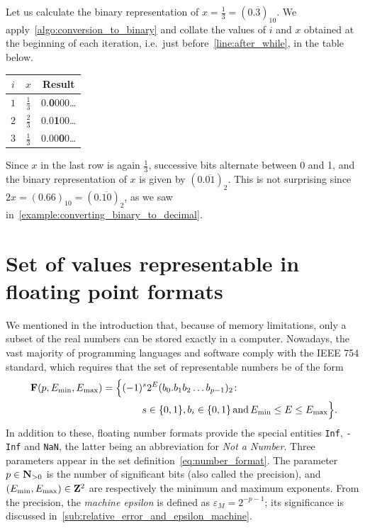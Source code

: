 \begin{example}
    Let us calculate the binary representation of $x = \frac{1}{3} = (0.\overline{3})_{10}$.
    We apply~\cref{algo:conversion_to_binary} and collate the values of $i$ and $x$ obtained at the beginning of each iteration,
    i.e.\ just before~\cref{line:after_while}, in the table below.
    \begin{center}
    \begin{tabular}{|c|c|c|}
        \hline
        $i$ & $x$ & Result \\ \hline
        $1$ & $\frac{1}{3}$ & 0.\textbf{0}000\dots \\ \hline
        $2$ & $\frac{2}{3}$ & 0.0\textbf{1}00\dots \\ \hline
        $3$ & $\frac{1}{3}$ & 0.00\textbf{0}0\dots \\ \hline
    \end{tabular}
    \end{center}
    Since $x$ in the last row is again $\frac{1}{3}$,
    successive bits alternate between 0 and 1,
    and the binary representation of $x$ is given by $(0.\overline{01})_2$.
    This is not surprising since $2x = (0.66)_{10} = (0.\overline{10})_2$,
    as we saw in~\cref{example:converting_binary_to_decimal}.
\end{example}



\section{Set of values representable in floating point formats}%
\label{sec:set_of_values}
We mentioned in the introduction that,
because of memory limitations,
only a subset of the real numbers can be stored exactly in a computer.
Nowadays, the vast majority of programming languages and software comply with the IEEE 754 standard,
which requires that the set of representable numbers be of the form
\begin{align}
    \notag
    \floating (p, E_{\min}, E_{\max})
    = \Bigl\{ & (-1)^s 2^E (b_0. b_1 b_2 \dots b_{p-1})_2 \colon \\
    \label{eq:number_format}%
              & \qquad s \in \{0, 1\}, b_i \in \{0, 1\} \, \text{and} \, E_{\min} \leq E \leq E_{\max} \Bigr\}.
\end{align}
In addition to these, floating number formats provide the special entities \texttt{Inf}, \texttt{-Inf} and \texttt{NaN},
the latter being an abbreviation for \emph{Not a Number}.
Three parameters appear in the set definition~\eqref{eq:number_format}.
The parameter $p \in \mathbf N_{>0}$ is the number of significant bits (also called the precision),
and $(E_{\min}, E_{\max}) \in \mathbf Z^2$ are respectively the minimum and maximum exponents.
From the precision, the \emph{machine epsilon} is defined as $\varepsilon_{M} = 2^{-p-1}$;
its significance is discussed in~\cref{sub:relative_error_and_epsilon_machine}.

